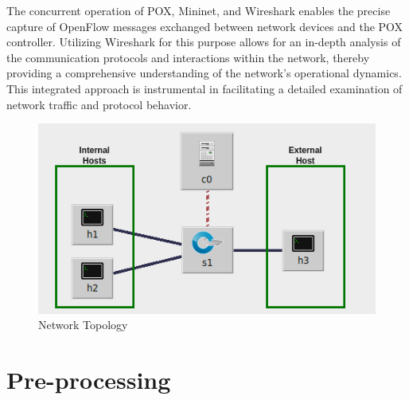 \documentclass[english,10pt]{article}
\begin{document}
The concurrent operation of POX, Mininet, and Wireshark enables the precise capture of OpenFlow messages exchanged between network devices and the POX controller. Utilizing Wireshark for this purpose allows for an in-depth analysis of the communication protocols and interactions within the network, thereby providing a comprehensive understanding of the network's operational dynamics. This integrated approach is instrumental in facilitating a detailed examination of network traffic and protocol behavior.



\begin{figure}[t]
\centering
\includegraphics[scale=0.55]{topo.png}    
\caption{Network Topology}
\label{fig:topo}
\end{figure}

\section{Pre-processing}
\end{document}
